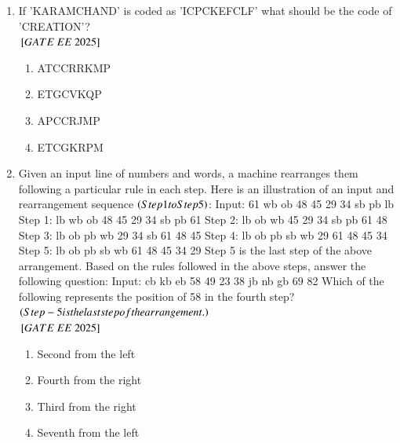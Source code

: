 \documentclass[journal,12pt,onecolumn]{IEEEtran}
\theoremstyle{remark}
\begin{document}
\begin{enumerate}
  \item If 'KARAMCHAND' is coded as 'ICPCKEFCLF' what should be the code of 'CREATION'? \\    
${}\left[GATE\ EE\ 2025\right]$\\
    \begin{enumerate}[label=(\Alph*)]
\item ATCCRRKMP \\
\item ETGCVKQP \\
\item APCCRJMP \\
\item ETCGKRPM \\
    \end{enumerate}
   \item { Given an input line of numbers and words, a machine rearranges them following a particular rule in each step. Here is an illustration of an input and rearrangement sequence  $\left(Step 1 to Step 5\right)$: \newline
Input: 61 wb ob 48 45 29 34 sb pb lb \newline
Step 1: lb wb ob 48 45 29 34 sb pb 61 \newline
Step 2: lb ob wb 45 29 34 sb pb 61 48 \newline
Step 3: lb ob pb wb 29 34 sb 61 48 45 \newline
Step 4: lb ob pb sb wb 29 61 48 45 34 \newline
Step 5: lb ob pb sb wb 61 48 45 34 29 \newline
Step 5 is the last step of the above arrangement. \newline
Based on the rules followed in the above steps, answer the following question: \newline
Input: cb kb eb 58 49 23 38 jb nb gb 69 82 \newline
Which of the following represents the position of 58 in the fourth step? $\left(Step-5 is the last step of the arrangement.\right)$ } \\   
${}\left[GATE\ EE\ 2025\right]$\\
    \begin{enumerate}[label=(\Alph*)]
\item Second from the left \\
\item Fourth from the right \\
\item Third from the right \\
\item Seventh from the left \\
    \end{enumerate}


\end{enumerate}
\end{document}
